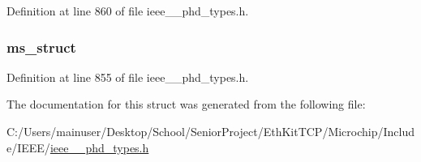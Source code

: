 Definition at line 860 of file ieee\+\_\+\_\+phd\+\_\+types.\+h.

\hypertarget{struct___metric_structure_small_a7f9c3ebc59ea7f2a644219509d51c1f1}{}
\subsubsection[{ms\+\_\+struct}]{ ms\+\_\+struct}\label{struct___metric_structure_small_a7f9c3ebc59ea7f2a644219509d51c1f1}


Definition at line 855 of file ieee\+\_\+\_\+phd\+\_\+types.\+h.



The documentation for this struct was generated from the following file\+:\begin{DoxyCompactItemize}
\item 
C\+:/\+Users/mainuser/\+Desktop/\+School/\+Senior\+Project/\+Eth\+Kit\+T\+C\+P/\+Microchip/\+Include/\+I\+E\+E\+E/\hyperlink{ieee__11073__phd__types_8h}{ieee\+\_\+\_\+phd\+\_\+types.\+h}\end{DoxyCompactItemize}
